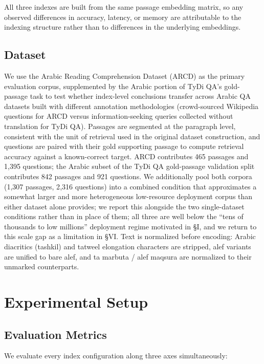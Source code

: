 \documentclass[conference]{IEEEtran}
\begin{document}
All three indexes are built from the same passage embedding matrix, so any observed differences in accuracy, latency, or memory are attributable to the indexing structure rather than to differences in the underlying embeddings.

\subsection{Dataset}

We use the Arabic Reading Comprehension Dataset (ARCD) \cite{mozannar2019neural} as the primary evaluation corpus, supplemented by the Arabic portion of TyDi QA's gold-passage task \cite{clark2020tydi} to test whether index-level conclusions transfer across Arabic QA datasets built with different annotation methodologies (crowd-sourced Wikipedia questions for ARCD versus information-seeking queries collected without translation for TyDi QA). Passages are segmented at the paragraph level, consistent with the unit of retrieval used in the original dataset construction, and questions are paired with their gold supporting passage to compute retrieval accuracy against a known-correct target. ARCD contributes 465 passages and 1{,}395 questions; the Arabic subset of the TyDi QA gold-passage validation split contributes 842 passages and 921 questions. We additionally pool both corpora (1{,}307 passages, 2{,}316 questions) into a combined condition that approximates a somewhat larger and more heterogeneous low-resource deployment corpus than either dataset alone provides; we report this alongside the two single-dataset conditions rather than in place of them; all three are well below the ``tens of thousands to low millions'' deployment regime motivated in \S I, and we return to this scale gap as a limitation in \S VI. Text is normalized before encoding: Arabic diacritics (tashkil) and tatweel elongation characters are stripped, alef variants are unified to bare alef, and ta marbuta / alef maqsura are normalized to their unmarked counterparts.

\section{Experimental Setup}

\subsection{Evaluation Metrics}

We evaluate every index configuration along three axes simultaneously:
\end{document}
